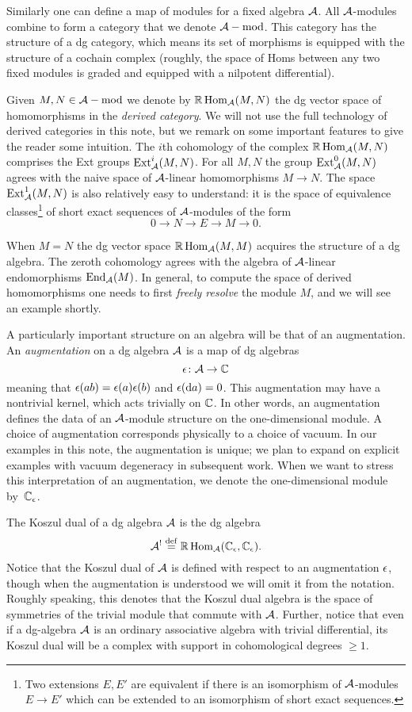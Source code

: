 \documentclass[11pt]{amsart}
\begin{document}
Similarly one can define a map of modules for a fixed algebra $\mathcal A$.  All $\mathcal A$-modules combine to form a category that we denote $\mathcal A-{\rm mod}$.
This category has the structure of a dg category, which means its set of morphisms is equipped with the structure of a cochain complex (roughly, the space of Homs between any two fixed modules is graded and equipped with a nilpotent differential). 

Given $M,N \in \mathcal A-{\rm mod}$ we denote by $\mathbb{R}\operatorname{Hom}_\mathcal A(M,N)$ the dg vector space of homomorphisms in the {\em derived category}. 
We will not use the full technology of derived categories in this note, but we remark on some important features to give the reader some intuition. 
The $i$th cohomology of the complex $\mathbb{R}\operatorname{Hom}_{\mathcal A} (M,N)$ comprises the Ext groups ${\rm Ext}^i_{\mathcal A}(M,N)$. 
For all $M,N$ the group ${\rm Ext}^0_{\mathcal A}(M,N)$ agrees with the naive space of $\mathcal A$-linear homomorphisms $M \to N$. 
The space ${\rm Ext}^1_{\mathcal A}(M,N)$ is also relatively easy to understand: it is the space of equivalence classes\footnote{Two extensions $E,E'$ are equivalent if there is an isomorphism of $\mathcal A$-modules $E \to E'$ which can be extended to an isomorphism of short exact sequences.} of short exact sequences of $\mathcal A$-modules of the form
\[
0 \to N \to E \to M \to 0 .
\]

 
When $M = N$ the dg vector space $\mathbb{R}\operatorname{Hom}_\mathcal A(M,M)$ acquires the structure of a dg algebra.
The zeroth cohomology agrees with the algebra of $\mathcal A$-linear endomorphisms ${\rm End}_{\mathcal A}(M)$.  
In general, to compute the space of derived homomorphisms one needs to first \textit{freely resolve} the module $M$, and we will see an example shortly.

A particularly important structure on an algebra will be that of an augmentation. 
An {\em augmentation} on a dg algebra $\mathcal A$ is a map of dg algebras 
\[
\epsilon \colon \mathcal A \to \mathbb C 
\]
meaning that $\epsilon (a b) = \epsilon(a) \epsilon(b)$ and $\epsilon ({\rm d} a) = 0$. This augmentation may have a nontrivial kernel, which acts trivially on $\mathbb C$. 
In other words, an augmentation defines the data of an $\mathcal A$-module structure on the one-dimensional module. A choice of augmentation corresponds physically to a choice of vacuum. In our examples in this note, the augmentation is unique; we plan to expand on explicit examples with vacuum degeneracy in subsequent work.
When we want to stress this interpretation of an augmentation, we denote the one-dimensional module by~$\mathbb C_\epsilon$.

The Koszul dual of a dg algebra $\mathcal A$ is the dg algebra
\[
\mathcal A^! \overset{\rm def}{=} \mathbb{R}\operatorname{Hom}_\mathcal A(\mathbb C_\epsilon,\mathbb C_\epsilon) .
\] 
Notice that the Koszul dual of $\mathcal A$ is defined with respect to an augmentation $\epsilon$, though when the augmentation is understood we will omit it from the notation. Roughly speaking, this denotes that the Koszul dual algebra is the space of symmetries of the trivial module that commute with $\mathcal A$. Further, notice that even if a dg-algebra $\mathcal A$ is an ordinary associative algebra with trivial differential, its Koszul dual will be a complex with support in cohomological degrees $\geq 1$.
\end{document}
